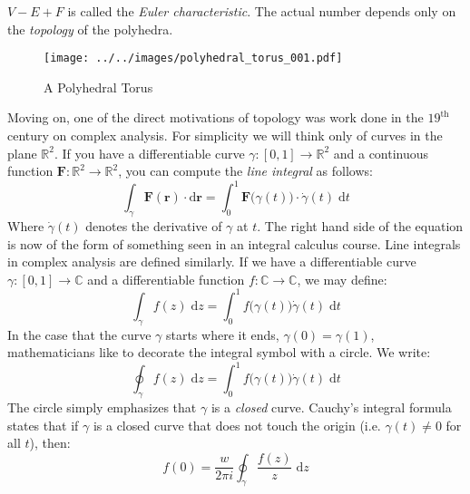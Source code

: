     $V-E+F$ is called the \textit{Euler characteristic}. The actual number
    depends only on the \textit{topology} of the polyhedra.
    \begin{figure}
        \centering
        \texttt{[image: ../../images/polyhedral\_torus\_001.pdf]}
        \caption{A Polyhedral Torus}
        \label{fig:polyhedral_torus_001}
    \end{figure}
    \par\hfill\par
    Moving on, one of the direct motivations of topology was work done in the
    $19^{\textrm{th}}$ century on complex analysis. For simplicity we will
    think only of curves in the plane $\mathbb{R}^{2}$. If you have a
    differentiable curve $\gamma:[0,1]\rightarrow\mathbb{R}^{2}$ and a
    continuous function
    $\mathbf{F}:\mathbb{R}^{2}\rightarrow\mathbb{R}^{2}$, you can compute the
    \textit{line integral} as follows:
    \begin{equation}
        \int_{\gamma}\mathbf{F}(\mathbf{r})\cdot\textrm{d}\mathbf{r}
            =\int_{0}^{1}\mathbf{F}\big(\gamma(t)\big)\cdot
                \dot{\gamma}(t)\;\textrm{d}t
    \end{equation}
    Where $\dot{\gamma}(t)$ denotes the derivative of $\gamma$ at $t$.
    The right hand side of the equation is now of the form of something seen
    in an integral calculus course. Line integrals in complex analysis are
    defined similarly. If we have a differentiable curve
    $\gamma:[0,1]\rightarrow\mathbb{C}$ and a differentiable function
    $f:\mathbb{C}\rightarrow\mathbb{C}$, we may define:
    \begin{equation}
        \int_{\gamma}f(z)\;\textrm{d}z
            =\int_{0}^{1}f\big(\gamma(t)\big)\dot{\gamma}(t)\;\textrm{d}t
    \end{equation}
    In the case that the curve $\gamma$ starts where it ends,
    $\gamma(0)=\gamma(1)$, mathematicians like to decorate the integral symbol
    with a circle. We write:
    \begin{equation}
        \oint_{\gamma}f(z)\;\textrm{d}z=
            \int_{0}^{1}f\big(\gamma(t)\big)\dot{\gamma}(t)\;\textrm{d}t
    \end{equation}
    The circle simply emphasizes that $\gamma$ is a \textit{closed} curve.
    Cauchy's integral formula states that if $\gamma$ is a closed curve that
    does not touch the origin (i.e. $\gamma(t)\ne{0}$ for all $t$), then:
    \begin{equation}
        f(0)=\frac{w}{2\pi{i}}\oint_{\gamma}\frac{f(z)}{z}\;\textrm{d}z
    \end{equation}
